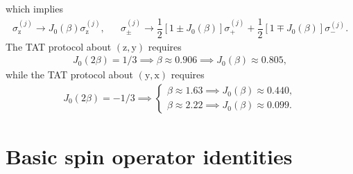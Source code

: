 \documentclass[aps,notitlepage,nofootinbib,11pt]{revtex4-1}
\newcommand{\f}[2]{\dfrac{#1}{#2}} %
\newcommand{\p}[1]{\left(#1\right)} %
\renewcommand{\sp}[1]{\left[#1\right]} %
\newcommand{\z}{\text{z}}
\newcommand{\x}{\text{x}}
\newcommand{\y}{\text{y}}
\newcommand{\1}{\mathds{1}}
\begin{document}
which implies
\begin{align}
  \sigma_\z^{(j)} \to J_0\p{\beta} \sigma_\z^{(j)},
  &&
  \sigma_\pm^{(j)}
  \to \f12\sp{1 \pm J_0\p{\beta}} \sigma_+^{(j)}
  + \f12\sp{1 \mp J_0\p{\beta}} \sigma_-^{(j)}.
\end{align}
The TAT protocol about $\p{\z,\y}$ requires
\begin{align}
  J_0\p{2\beta} = 1/3
  \implies \beta \approx 0.906
  \implies J_0\p{\beta} \approx 0.805,
\end{align}
while the TAT protocol about $\p{\y,\x}$ requires
\begin{align}
  J_0\p{2\beta} = -1/3
  \implies
  \begin{cases}
    \beta \approx 1.63
    \implies J_0\p{\beta} \approx 0.440, \\
    \beta \approx 2.22
    \implies J_0\p{\beta} \approx 0.099.
  \end{cases}
\end{align}




\newpage
\appendix

\section{Basic spin operator identities}
\label{sec:identities}
\end{document}
